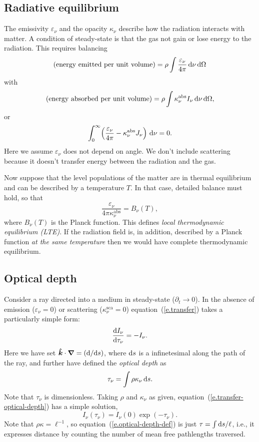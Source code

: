 \subsection{Radiative equilibrium} 
The emissivity $\varepsilon_{\nu}$ and the opacity $\kappa_{\nu}$ describe how the radiation interacts with matter. A condition of steady-state is that the gas not gain or lose energy to the radiation. This requires balancing
\[ \left(\textrm{energy emitted per unit volume}\right) = \rho\int\frac{\varepsilon_{\nu}}{4\pi}\,\mathrm{d}\nu\,\mathrm{d}\Omega\] 
with
\[ \left(\textrm{energy absorbed per unit volume}\right) = \rho\int \kappa_{\nu}^{\mathrm{abs}} I_{\nu}\,\mathrm{d}\nu\,\mathrm{d}\Omega,\]
or
\begin{equation}\label{e.rad-equil}
\int_{0}^{\infty}\! \left(\frac{\varepsilon_{\nu}}{4\pi} - \kappa_{\nu}^{\mathrm{abs}} J_{\nu}\right)\,\mathrm{d}\nu = 0.
\end{equation}
Here we assume $\varepsilon_{\nu}$ does not depend on angle. We don't include scattering because it doesn't transfer energy between the radiation and the gas.

Now suppose that the level populations of the matter are in thermal equilibrium and can be described by a temperature $T$.  In that case, detailed balance must hold, so that
\begin{equation}\label{e.detail-balance}
\frac{\varepsilon_{\nu}}{4\pi\kappa_{\nu}^{\mathrm{abs}}} = B_{\nu}(T),
\end{equation}
where $B_{\nu}(T)$ is the Planck function. This defines \emph{local thermodynamic equilibrium (LTE)}. If the radiation field is, in addition, described by a Planck function \emph{at the same temperature} then we would have complete thermodynamic equilibrium.

\subsection{Optical depth}

Consider a ray directed into a medium in steady-state ($\partial_{t}\to 0$).  In the absence of emission ($\varepsilon_{\nu}=0$) or scattering ($\kappa_{\nu}^{\mathrm{sca}}=0$) equation~(\ref{e.transfer}) takes a particularly simple form:
\begin{equation}\label{e.transfer-optical-depth}
\frac{\mathrm{d} I_{\nu}}{\mathrm{d} \tau_{\nu}} = -I_{\nu}.
\end{equation}
Here we have set $\bm{\hat{k}}\cdot\bm{\nabla} = (\mathrm{d}/\mathrm{d} s)$, where $\mathrm{d} s$ is a infinetesimal along the path of the ray, and further have defined the \emph{optical depth} as
\begin{equation}\label{e.optical-depth-def}
\tau_{\nu} = \int \rho\kappa_{\nu}\,\mathrm{d} s.
\end{equation}
Note that $\tau_{\nu}$ is dimensionless. Taking $\rho$ and $\kappa_{\nu}$ as given, equation~(\ref{e.transfer-optical-depth}) has a simple solution,
\[ I_{\nu}(\tau_{\nu}) = I_{\nu}(0)\exp\left(-\tau_{\nu}\right). \]
Note that $\rho\kappa=\ell^{-1}$, so equation~(\ref{e.optical-depth-def}) is just $\tau = \int \mathrm{d} s/\ell$, i.e., it expresses distance by counting the number of mean free pathlengths traversed.

